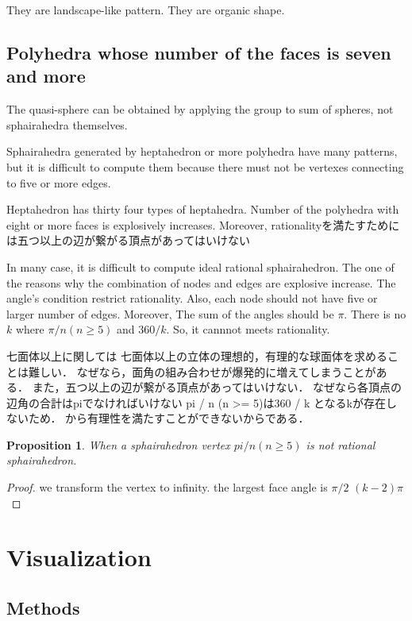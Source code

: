 \documentclass[dvipdfmx]{interact}
\theoremstyle{plain}%
\newtheorem{proposition}[theorem]{Proposition}
\theoremstyle{definition}
\theoremstyle{remark}
\theoremstyle{problemstyle}
\begin{document}
They are landscape-like pattern.
They are organic shape.

\subsection{Polyhedra whose number of the faces is seven and more }
The quasi-sphere can be obtained by applying the group to sum of
spheres, not sphairahedra themselves.

Sphairahedra generated by heptahedron or more polyhedra have many
patterns, but it is difficult to compute them 
because there must not be vertexes connecting to five or more edges.

Heptahedron has thirty four types of heptahedra.
Number of the polyhedra with eight or more faces is explosively increases.
Moreover, rationalityを満たすためには五つ以上の辺が繋がる頂点があってはいけない

In many case, it is difficult to compute ideal rational sphairahedron.
The one of the reasons why the combination of nodes and edges are 
explosive increase.
The angle's condition restrict rationality.
Also, each node should not have five or larger number of edges.
Moreover, The sum of the angles should be $\pi$.
There is no $k$ where $\pi / n (n \geq 5)$ and $360/k$.
So, it cannnot meets rationality.

七面体以上に関しては
七面体以上の立体の理想的，有理的な球面体を求めることは難しい．
なぜなら，面角の組み合わせが爆発的に増えてしまうことがある．
また，五つ以上の辺が繋がる頂点があってはいけない．
なぜなら各頂点の辺角の合計はpiでなければいけない
pi / n (n >= 5)は360 / k となるkが存在しないため．
から有理性を満たすことができないからである．

\begin{proposition}
 When a sphairahedron 
 vertex $pi / n (n \geq 5)$
 is not rational sphairahedron.
\end{proposition}

\begin{proof}
 we transform the vertex to infinity.
 the largest face angle is $\pi / 2$
 $(k - 2)\pi$
\end{proof}

\section{Visualization}

\subsection{Methods}
\end{document}

